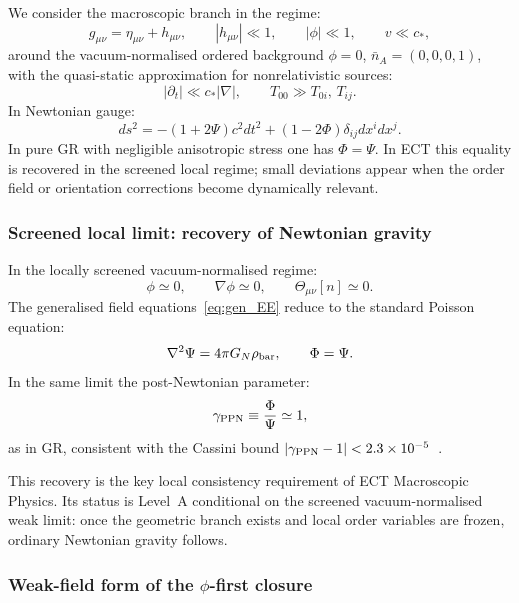 We consider the macroscopic branch in the regime:
\begin{equation}
  \label{eq:weak_field_expansion}
  g_{\mu\nu}=\eta_{\mu\nu}+h_{\mu\nu},
  \qquad |h_{\mu\nu}|\ll 1,
  \qquad |\phi|\ll 1,
  \qquad v\ll c_*,
\end{equation}
around the vacuum-normalised ordered background
$\phi=0$, $\bar{n}_A=(0,0,0,1)$, with the quasi-static approximation
for nonrelativistic sources:
\begin{equation}
  \label{eq:quasistatic}
  |\partial_t|\ll c_*|\nabla|,
  \qquad T_{00}\gg T_{0i},\,T_{ij}.
\end{equation}
In Newtonian gauge:
\begin{equation}
  \label{eq:newtonian_gauge}
  ds^2 = -(1+2\Psi)c^2dt^2 + (1-2\Phi)\delta_{ij}dx^idx^j.
\end{equation}
In pure GR with negligible anisotropic stress one has $\Phi=\Psi$.
In ECT this equality is recovered in the screened local regime;
small deviations appear when the order field or orientation corrections
become dynamically relevant.

\subsubsection*{Screened local limit: recovery of Newtonian gravity}

In the locally screened vacuum-normalised regime:
\[
\phi\simeq 0,\qquad \nabla\phi\simeq 0,\qquad \Theta_{\mu\nu}[n]\simeq 0.
\]
The generalised field equations~\eqref{eq:gen_EE} reduce to the
standard Poisson equation:
\begin{equation}
  \label{eq:Poisson_standard}
  \nabla^2\Psi = 4\pi G_N\rho_{\rm bar},
  \qquad \Phi=\Psi.
\end{equation}
In the same limit the post-Newtonian parameter:
\begin{equation}
  \label{eq:PPN_gamma}
  \gamma_{\rm PPN}\equiv\frac{\Phi}{\Psi}\simeq 1,
\end{equation}
as in GR, consistent with the Cassini bound
$|\gamma_{\rm PPN}-1|<2.3\times10^{-5}$~\cite{Bertotti2003}.

This recovery is the key local consistency requirement of ECT
Macroscopic Physics.
Its status is Level~A conditional on the screened vacuum-normalised weak
limit: once the geometric branch exists and local order variables are
frozen, ordinary Newtonian gravity follows.

\subsubsection*{Weak-field form of the $\phi$-first closure}

